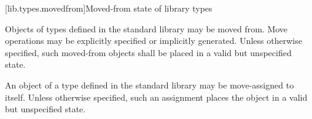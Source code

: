 [lib.types.movedfrom]{Moved-from state of library types}

\pnum
Objects of types defined in the \Cpp{} standard library may be moved
from. Move operations may be explicitly specified or
implicitly generated. Unless otherwise specified, such moved-from objects shall
be placed in a valid but unspecified state.

\pnum
An object of a type defined in the \Cpp{} standard library may be
move-assigned to itself.
Unless otherwise specified, such an assignment places the object in
a valid but unspecified state.
